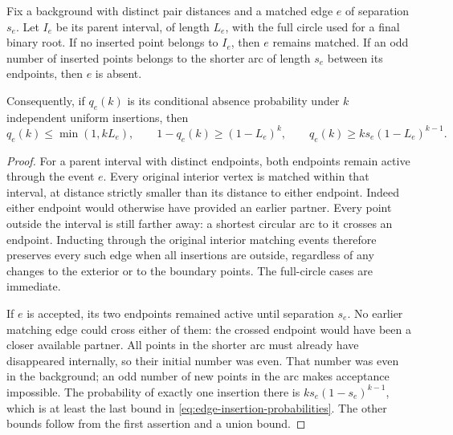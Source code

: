 \documentclass[11pt,letterpaper]{article}
\begin{document}
\begin{lemma}
\label{lem:edge-insertions}
Fix a background with distinct pair distances and a matched edge
$e$ of separation $s_e$. Let $I_e$ be its parent interval, of length
$L_e$, with the full circle used for a final binary root.
If no inserted point belongs to $I_e$, then $e$ remains matched.
If an odd number of inserted points belongs to the shorter arc of
length $s_e$ between its endpoints, then $e$ is absent.

Consequently, if $q_e(k)$ is its conditional absence probability
under $k$ independent uniform insertions, then
\begin{equation}\label{eq:edge-insertion-probabilities}
 q_e(k)\le\min(1,kL_e),\qquad
 1-q_e(k)\ge(1-L_e)^k,\qquad
 q_e(k)\ge k s_e(1-L_e)^{k-1}.
\end{equation}
\end{lemma}
\begin{proof}
For a parent interval with distinct endpoints, both endpoints remain
active through the event $e$. Every original interior vertex is
matched within that interval, at distance strictly smaller than its
distance to either endpoint. Indeed either endpoint would otherwise
have provided an earlier partner. Every point outside the interval
is still farther away: a shortest circular arc to it crosses an
endpoint. Inducting through the original interior matching events
therefore preserves every such edge when all insertions are outside,
regardless of any changes to the exterior or to the boundary points.
The full-circle cases are immediate.

If $e$ is accepted, its two endpoints remained active until
separation $s_e$. No earlier matching edge could cross either of
them: the crossed endpoint would have been a closer available
partner. All points in the shorter arc must already have disappeared
internally, so their initial number was even. That number was even
in the background; an odd number of new points in the arc makes
acceptance impossible. The probability of exactly one insertion
there is $k s_e(1-s_e)^{k-1}$, which is at least the last bound in
\eqref{eq:edge-insertion-probabilities}. The other bounds follow
from the first assertion and a union bound.
\end{proof}
\end{document}
